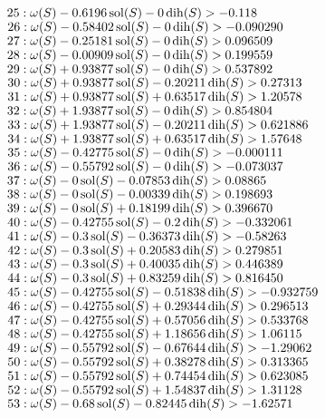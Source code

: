 $25:  \omega(S) - 0.6196 \operatorname{sol}(S) - 0 \operatorname{dih}(S) > -0.118$\newline
$26:  \omega(S) - 0.58402 \operatorname{sol}(S) - 0 \operatorname{dih}(S) > -0.090290$\newline
$27:  \omega(S) - 0.25181 \operatorname{sol}(S) - 0 \operatorname{dih}(S) > 0.096509$\newline
$28:  \omega(S) - 0.00909 \operatorname{sol}(S) - 0 \operatorname{dih}(S) > 0.199559$\newline
$29:  \omega(S) + 0.93877 \operatorname{sol}(S) - 0 \operatorname{dih}(S) > 0.537892$\newline
$30:  \omega(S) + 0.93877 \operatorname{sol}(S) - 0.20211 \operatorname{dih}(S) > 0.27313$\newline
$31:  \omega(S) + 0.93877 \operatorname{sol}(S) + 0.63517 \operatorname{dih}(S) > 1.20578$\newline
$32:  \omega(S) + 1.93877 \operatorname{sol}(S) - 0 \operatorname{dih}(S) > 0.854804$\newline
$33:  \omega(S) + 1.93877 \operatorname{sol}(S) - 0.20211 \operatorname{dih}(S) > 0.621886$\newline
$34:  \omega(S) + 1.93877 \operatorname{sol}(S) + 0.63517 \operatorname{dih}(S) > 1.57648$\newline
$35:  \omega(S) - 0.42775 \operatorname{sol}(S) - 0 \operatorname{dih}(S) > -0.000111$\newline
$36:  \omega(S) - 0.55792 \operatorname{sol}(S) - 0 \operatorname{dih}(S) > -0.073037$\newline
$37:  \omega(S) - 0 \operatorname{sol}(S) - 0.07853 \operatorname{dih}(S) > 0.08865$\newline
$38:  \omega(S) - 0 \operatorname{sol}(S) - 0.00339 \operatorname{dih}(S) > 0.198693$\newline
$39:  \omega(S) - 0 \operatorname{sol}(S) + 0.18199 \operatorname{dih}(S) > 0.396670$\newline
$40:  \omega(S) - 0.42755 \operatorname{sol}(S) - 0.2 \operatorname{dih}(S) > -0.332061$\newline
$41:  \omega(S) - 0.3 \operatorname{sol}(S) - 0.36373 \operatorname{dih}(S) > -0.58263$\newline
$42:  \omega(S) - 0.3 \operatorname{sol}(S) + 0.20583 \operatorname{dih}(S) > 0.279851$\newline
$43:  \omega(S) - 0.3 \operatorname{sol}(S) + 0.40035 \operatorname{dih}(S) > 0.446389$\newline
$44:  \omega(S) - 0.3 \operatorname{sol}(S) + 0.83259 \operatorname{dih}(S) > 0.816450$\newline
$45:  \omega(S) - 0.42755 \operatorname{sol}(S) - 0.51838 \operatorname{dih}(S) > -0.932759$\newline
$46:  \omega(S) - 0.42755 \operatorname{sol}(S) + 0.29344 \operatorname{dih}(S) > 0.296513$\newline
$47:  \omega(S) - 0.42755 \operatorname{sol}(S) + 0.57056 \operatorname{dih}(S) > 0.533768$\newline
$48:  \omega(S) - 0.42755 \operatorname{sol}(S) + 1.18656 \operatorname{dih}(S) > 1.06115$\newline
$49:  \omega(S) - 0.55792 \operatorname{sol}(S) - 0.67644 \operatorname{dih}(S) > -1.29062$\newline
$50:  \omega(S) - 0.55792 \operatorname{sol}(S) + 0.38278 \operatorname{dih}(S) > 0.313365$\newline
$51:  \omega(S) - 0.55792 \operatorname{sol}(S) + 0.74454 \operatorname{dih}(S) > 0.623085$\newline
$52:  \omega(S) - 0.55792 \operatorname{sol}(S) + 1.54837 \operatorname{dih}(S) > 1.31128$\newline
$53:  \omega(S) - 0.68 \operatorname{sol}(S) - 0.82445 \operatorname{dih}(S) > -1.62571$\newline
\smallskip

